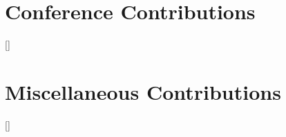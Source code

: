 \section*{Conference Contributions}

\begin{refsection}
[\refname]{}
\nocite{
gunter2010using,
ditmar2010mitigation,
hashemi2010contribution,
gunter2011investigation,
gunter2012potential,
doornbos2012thermospheric,
Olsen2013,
doornbos2013air,
bruinsma2014results,
astafyeva2015ionospheric,
doornbos2015processing,
Siemes2015,
jaggi2016european,
siemes2016improvements,
doornbos2016thermospheric}
\printbibliography
\end{refsection}




\section*{Miscellaneous Contributions}

\begin{refsection}
[\refname]{}
\nocite{
Iran-Pour2015,
Anselmi2010}
\printbibliography
\end{refsection}







